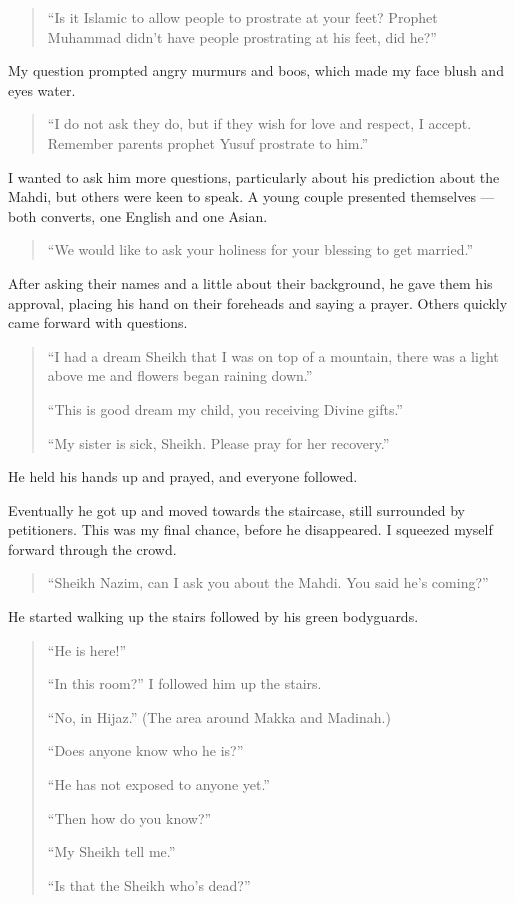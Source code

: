 \documentclass[12pt]{memoir}
\begin{document}
\begin{quote}
“Is it Islamic to allow people to prostrate at your feet?
Prophet Muhammad didn’t have people prostrating at his feet, did he?”
\end{quote}

My question prompted angry murmurs and boos,
which made my face blush and eyes water.

\begin{quote}
“I do not ask they do, but if they wish for love and respect, I accept.
Remember parents prophet Yusuf prostrate to him.”
\end{quote}

I wanted to ask him more questions,
particularly about his prediction about the Mahdi,
but others were keen to speak.
A young couple presented themselves —
both converts, one English and one Asian.

\begin{quote}
“We would like to ask your holiness for your blessing to get married.”
\end{quote}

After asking their names and a little about their background,
he gave them his approval,
placing his hand on their foreheads and saying a prayer.
Others quickly came forward with questions.

\begin{quote}
“I had a dream Sheikh that I was on top of a mountain,
there was a light above me and flowers began raining down.”

“This is good dream my child, you receiving Divine gifts.”

“My sister is sick, Sheikh. Please pray for her recovery.”
\end{quote}

He held his hands up and prayed, and everyone followed.

Eventually he got up and moved towards the staircase,
still surrounded by petitioners.
This was my final chance, before he disappeared.
I squeezed myself forward through the crowd.

\begin{quote}
“Sheikh Nazim, can I ask you about the Mahdi. You said he’s coming?”
\end{quote}

He started walking up the stairs followed by his green bodyguards.

\begin{quote}
“He is here!”

“In this room?” I followed him up the stairs.

“No, in Hijaz.” (The area around Makka and Madinah.)

“Does anyone know who he is?”

“He has not exposed to anyone yet.”

“Then how do you know?”

“My Sheikh tell me.”

“Is that the Sheikh who’s dead?”
\end{quote}
\end{document}
